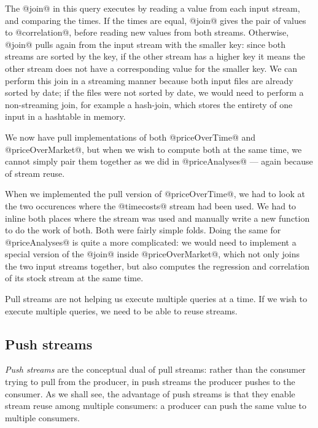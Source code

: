 The @join@ in this query executes by reading a value from each input stream, and comparing the times.
If the times are equal, @join@ gives the pair of values to @correlation@, before reading new values from both streams.
Otherwise, @join@ pulls again from the input stream with the smaller key: since both streams are sorted by the key, if the other stream has a higher key it means the other stream does not have a corresponding value for the smaller key.
We can perform this join in a streaming manner because both input files are already sorted by date; if the files were not sorted by date, we would need to perform a non-streaming join, for example a hash-join, which stores the entirety of one input in a hashtable in memory.

We now have pull implementations of both @priceOverTime@ and @priceOverMarket@, but when we wish to compute both at the same time, we cannot simply pair them together as we did in @priceAnalyses@ --- again because of stream reuse.

When we implemented the pull version of @priceOverTime@, we had to look at the two occurences where the @timecosts@ stream had been used.
We had to inline both places where the stream was used and manually write a new function to do the work of both.
Both were fairly simple folds.
Doing the same for @priceAnalyses@ is quite a more complicated: we would need to implement a special version of the @join@ inside @priceOverMarket@, which not only joins the two input streams together, but also computes the regression and correlation of its stock stream at the same time.

Pull streams are not helping us execute multiple queries at a time.
If we wish to execute multiple queries, we need to be able to reuse streams.

\subsection{Push streams}

\emph{Push streams} are the conceptual dual of pull streams: rather than the consumer trying to pull from the producer, in push streams the producer pushes to the consumer.
As we shall see, the advantage of push streams is that they enable stream reuse among multiple consumers: a producer can push the same value to multiple consumers.

